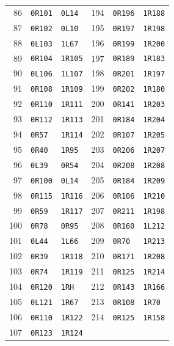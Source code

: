 \begin{longtable}{rll@{\hspace{18mm}}rll}
86 & \texttt{0R101} & \texttt{0L14} & 194 & \texttt{0R196} & \texttt{1R188} \\
87 & \texttt{0R102} & \texttt{0L10} & 195 & \texttt{0R197} & \texttt{1R198} \\
88 & \texttt{0L103} & \texttt{1L67} & 196 & \texttt{0R199} & \texttt{1R200} \\
89 & \texttt{0R104} & \texttt{1R105} & 197 & \texttt{0R189} & \texttt{1R183} \\
90 & \texttt{0L106} & \texttt{1L107} & 198 & \texttt{0R201} & \texttt{1R197} \\
91 & \texttt{0R108} & \texttt{1R109} & 199 & \texttt{0R202} & \texttt{1R180} \\
92 & \texttt{0R110} & \texttt{1R111} & 200 & \texttt{0R141} & \texttt{1R203} \\
93 & \texttt{0R112} & \texttt{1R113} & 201 & \texttt{0R184} & \texttt{1R204} \\
94 & \texttt{0R57} & \texttt{1R114} & 202 & \texttt{0R107} & \texttt{1R205} \\
95 & \texttt{0R40} & \texttt{1R95} & 203 & \texttt{0R206} & \texttt{1R207} \\
96 & \texttt{0L39} & \texttt{0R54} & 204 & \texttt{0R208} & \texttt{1R208} \\
97 & \texttt{0R100} & \texttt{0L14} & 205 & \texttt{0R184} & \texttt{1R209} \\
98 & \texttt{0R115} & \texttt{1R116} & 206 & \texttt{0R106} & \texttt{1R210} \\
99 & \texttt{0R59} & \texttt{1R117} & 207 & \texttt{0R211} & \texttt{1R198} \\
100 & \texttt{0R78} & \texttt{0R95} & 208 & \texttt{0R160} & \texttt{1L212} \\
101 & \texttt{0L44} & \texttt{1L66} & 209 & \texttt{0R70} & \texttt{1R213} \\
102 & \texttt{0R39} & \texttt{1R118} & 210 & \texttt{0R171} & \texttt{1R208} \\
103 & \texttt{0R74} & \texttt{1R119} & 211 & \texttt{0R125} & \texttt{1R214} \\
104 & \texttt{0R120} & \texttt{1RH} & 212 & \texttt{0R143} & \texttt{1R166} \\
105 & \texttt{0L121} & \texttt{1R67} & 213 & \texttt{0R108} & \texttt{1R70} \\
106 & \texttt{0R110} & \texttt{1R122} & 214 & \texttt{0R125} & \texttt{1R158} \\
107 & \texttt{0R123} & \texttt{1R124} &  &  &  \\
\end{longtable}
\renewcommand{\arraystretch}{1}
\normalsize
